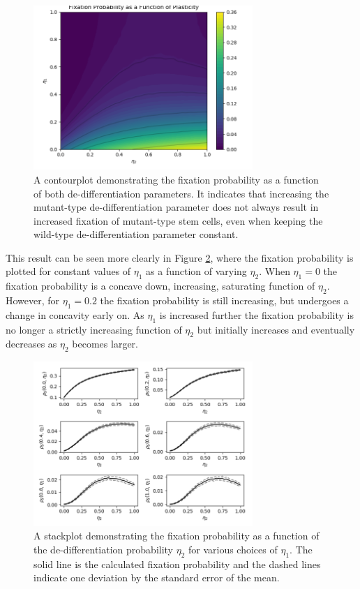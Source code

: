 \documentclass[12pt]{article}
\begin{document}
\begin{figure}[!ht]
\begin{center}
\includegraphics[width=0.74\textwidth]{contourplot.png}
\end{center}
\caption{A contourplot demonstrating the fixation probability as a function of both de-differentiation parameters. It indicates that increasing the mutant-type de-differentiation parameter does not always result in increased fixation of mutant-type stem cells, even when keeping the wild-type de-differentiation parameter constant.}\label{contour}
\end{figure}

This result can be seen more clearly in Figure \ref{constantEta1Stack}, where the fixation probability is plotted for constant values of $\eta_1$ as a function of varying $\eta_2$. When $\eta_1=0$ the fixation probability is a concave down, increasing, saturating function of $\eta_2$. However, for $\eta_1=0.2$ the fixation probability is still increasing, but undergoes a change in concavity early on. As $\eta_1$ is increased further the fixation probability is no longer a strictly increasing function of $\eta_2$ but initially increases and eventually decreases as $\eta_2$ becomes larger.

\begin{figure}[!ht]
\begin{center}
\includegraphics[width=0.74\textwidth]{constant_eta1_stackplot.png}
\end{center}
\caption{A stackplot demonstrating the fixation probability as a function of the de-differentiation probability $\eta_2$ for various choices of $\eta_1$. The solid line is the calculated fixation probability and the dashed lines indicate one deviation by the standard error of the mean.}\label{constantEta1Stack}
\end{figure}
\end{document}
